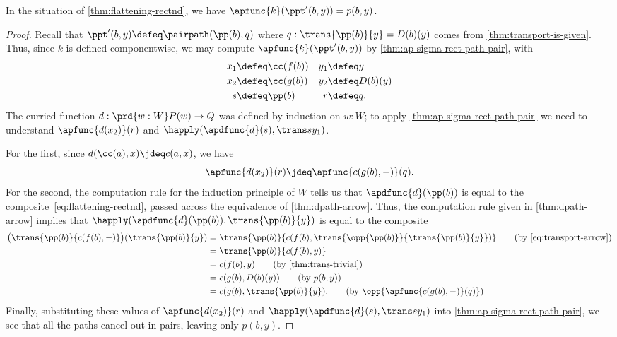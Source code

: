 \begin{lem}\label{thm:flattening-rectnd-beta-ppt}
  In the situation of \cref{thm:flattening-rectnd}, we have $\apfunc{k}(\ppt'(b,y)) = p(b,y)$.
\end{lem}
\begin{proof}
  Recall that $\ppt'(b,y) \defeq \pairpath(\pp(b),q)$ where $q:\trans{\pp(b)}{y} = D(b)(y)$ comes from \cref{thm:transport-is-given}.
  Thus, since $k$ is defined componentwise, we may compute $\apfunc{k}(\ppt'(b,y))$ by \cref{thm:ap-sigma-rect-path-pair}, with
  \begin{align*}
    x_1 &\defeq \cc(f(b)) & y_1 &\defeq y\\
    x_2 &\defeq \cc(g(b)) & y_2 &\defeq D(b)(y)\\
    s &\defeq \pp(b)      &   r &\defeq q.
  \end{align*}
  The curried function $d:\prd{w:W} P(w) \to Q$ was defined by induction on $w:W$;
  to apply \cref{thm:ap-sigma-rect-path-pair} we need to understand $\apfunc{d(x_2)}(r)$ and $\happly(\apdfunc{d}(s),\trans s {y_1})$.

  For the first, since $d(\cc(a),x)\jdeq c(a,x)$, we have
  \[ \apfunc{d(x_2)}(r) \jdeq \apfunc{c(g(b),-)}(q). \]
  For the second, the computation rule for the induction principle of $W$ tells us that $\apdfunc{d}(\pp(b))$ is equal to the composite~\eqref{eq:flattening-rectnd}, passed across the equivalence of \cref{thm:dpath-arrow}.
  Thus, the computation rule given in \cref{thm:dpath-arrow} implies that $\happly(\apdfunc{d}(\pp(b)),\trans {\pp(b)}{y})$ is equal to the composite
  \begin{align}
    \big(\trans{\pp(b)}{c(f(b),-)}\big)(\trans {\pp(b)}{y})
    &= \trans{\pp(b)}{c(f(b),\trans{\opp {\pp(b)}}{\trans {\pp(b)}{y}})}
    \tag{by~\eqref{eq:transport-arrow}}\\
    &= \trans{\pp(b)}{c(f(b),y)}
    \notag \\
    &= c(f(b),y)
    \tag{by \cref{thm:trans-trivial}}\\
    &= c(g(b),D(b)(y))
   \tag{by $p(b,y)$}\\
    &= c(g(b),\trans{\pp(b)}{y}).
    \tag{by $\opp{\apfunc{c(g(b),-)}(q)}$}
  \end{align}
  Finally, substituting these values of $\apfunc{d(x_2)}(r)$ and $\happly(\apdfunc{d}(s),\trans s {y_1})$ into \cref{thm:ap-sigma-rect-path-pair}, we see that all the paths cancel out in pairs, leaving only $p(b,y)$.
\end{proof}


